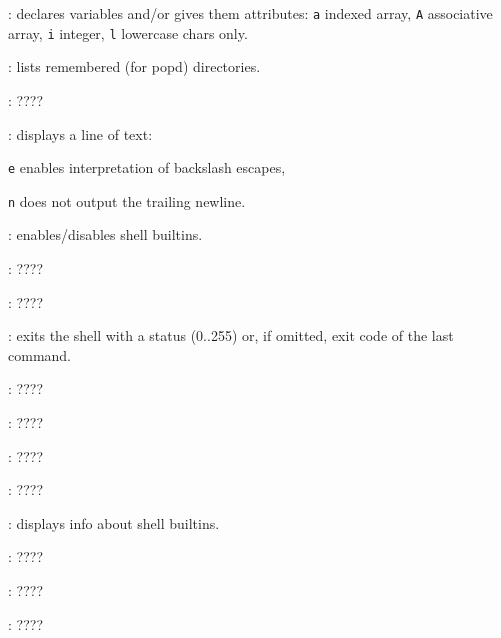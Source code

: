 \begin{compactenum}
\item [\symbolbash] : declares variables and/or gives them attributes: \texttt{a} indexed array, \texttt{A} associative array, \texttt{i} integer, \texttt{l} lowercase chars only.

\item [\symbolbash] : lists remembered (for popd) directories.

\item [\symbolbash] : \dotfill ????

\item [\symbolbash] : displays a line of text:
\item [\texttt{e}] enables interpretation of backslash escapes,
\item [\texttt{n}] does not output the trailing newline.

\item [\symbolbash] : enables/disables shell builtins.

\item [\symbolbash] : \dotfill ????

\item [\symbolbash] : \dotfill ????

\item [\symbolbash] : exits the shell with a status (0..255) or, if omitted, exit code of the last command.

\item [\symbolbash] : \dotfill ????

\item [\symbolbash] : \dotfill ????

\item [\symbolbash] : \dotfill ????

\item [\symbolbash] : \dotfill ????

\item [\symbolbash] : displays info about shell builtins.

\item [\symbolbash] : \dotfill ????

\item [\symbolbash] : \dotfill ????

\item [\symbolbash] : \dotfill ????


\end{compactenum}
